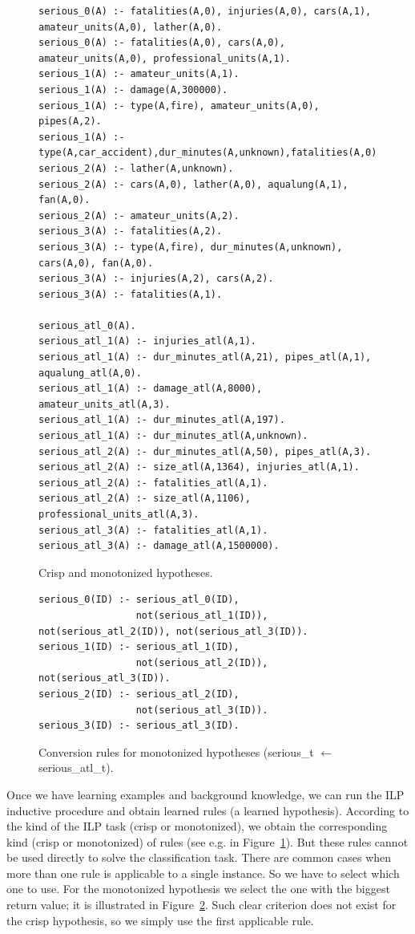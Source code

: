 \begin{figure}
\begin{verbatim}
serious_0(A) :- fatalities(A,0), injuries(A,0), cars(A,1), amateur_units(A,0), lather(A,0).
serious_0(A) :- fatalities(A,0), cars(A,0), amateur_units(A,0), professional_units(A,1).
serious_1(A) :- amateur_units(A,1).
serious_1(A) :- damage(A,300000).
serious_1(A) :- type(A,fire), amateur_units(A,0), pipes(A,2).
serious_1(A) :- type(A,car_accident),dur_minutes(A,unknown),fatalities(A,0),injuries(A,1).
serious_2(A) :- lather(A,unknown).
serious_2(A) :- cars(A,0), lather(A,0), aqualung(A,1), fan(A,0).
serious_2(A) :- amateur_units(A,2).
serious_3(A) :- fatalities(A,2).
serious_3(A) :- type(A,fire), dur_minutes(A,unknown), cars(A,0), fan(A,0).
serious_3(A) :- injuries(A,2), cars(A,2).
serious_3(A) :- fatalities(A,1).

serious_atl_0(A).
serious_atl_1(A) :- injuries_atl(A,1).
serious_atl_1(A) :- dur_minutes_atl(A,21), pipes_atl(A,1), aqualung_atl(A,0).
serious_atl_1(A) :- damage_atl(A,8000), amateur_units_atl(A,3).
serious_atl_1(A) :- dur_minutes_atl(A,197).
serious_atl_1(A) :- dur_minutes_atl(A,unknown).
serious_atl_2(A) :- dur_minutes_atl(A,50), pipes_atl(A,3).
serious_atl_2(A) :- size_atl(A,1364), injuries_atl(A,1).
serious_atl_2(A) :- fatalities_atl(A,1).
serious_atl_2(A) :- size_atl(A,1106), professional_units_atl(A,3).
serious_atl_3(A) :- fatalities_atl(A,1).
serious_atl_3(A) :- damage_atl(A,1500000).
\end{verbatim}
\caption{Crisp and monotonized hypotheses.}
\label{fig:rules}
\end{figure}


\begin{figure}	
\begin{verbatim}
serious_0(ID) :- serious_atl_0(ID),
                 not(serious_atl_1(ID)), not(serious_atl_2(ID)), not(serious_atl_3(ID)).
serious_1(ID) :- serious_atl_1(ID),
                 not(serious_atl_2(ID)), not(serious_atl_3(ID)).
serious_2(ID) :- serious_atl_2(ID),
                 not(serious_atl_3(ID)).
serious_3(ID) :- serious_atl_3(ID).
\end{verbatim}						
\caption{Conversion rules for monotonized hypotheses (serious\_t $\leftarrow$ serious\_atl\_t).}
\label{fig:conversion}
\end{figure}



Once we have learning examples and background knowledge, we can run the ILP inductive procedure and obtain learned rules (a learned hypothesis). According to the kind of the ILP task (crisp or monotonized), we obtain the corresponding kind (crisp or monotonized) of rules (see e.g. in Figure~\ref{fig:rules}). But these rules cannot be used directly to solve the classification task. There are common cases when more than one rule is applicable to a single instance. So we have to select which one to use. For the monotonized hypothesis we select the one with the biggest return value; it is illustrated in Figure~\ref{fig:conversion}. Such clear criterion does not exist for the crisp hypothesis, so we simply use the first applicable rule.


